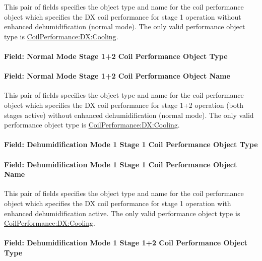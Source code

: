 This pair of fields specifies the object type and name for the coil performance object which specifies the DX coil performance for stage 1 operation without enhanced dehumidification (normal mode). The only valid performance object type is \hyperref[coilperformancedxcooling]{CoilPerformance:DX:Cooling}.

\paragraph{Field: Normal Mode Stage 1+2 Coil Performance Object Type}\label{field-normal-mode-stage-12-coil-performance-object-type}

\paragraph{Field: Normal Mode Stage 1+2 Coil Performance Object Name}\label{field-normal-mode-stage-12-coil-performance-object-name}

This pair of fields specifies the object type and name for the coil performance object which specifies the DX coil performance for stage 1+2 operation (both stages active) without enhanced dehumidification (normal mode). The only valid performance object type is \hyperref[coilperformancedxcooling]{CoilPerformance:DX:Cooling}.

\paragraph{Field: Dehumidification Mode 1 Stage 1 Coil Performance Object Type}\label{field-dehumidification-mode-1-stage-1-coil-performance-object-type}

\paragraph{Field: Dehumidification Mode 1 Stage 1 Coil Performance Object Name}\label{field-dehumidification-mode-1-stage-1-coil-performance-object-name}

This pair of fields specifies the object type and name for the coil performance object which specifies the DX coil performance for stage 1 operation with enhanced dehumidification active. The only valid performance object type is \hyperref[coilperformancedxcooling]{CoilPerformance:DX:Cooling}.

\paragraph{Field: Dehumidification Mode 1 Stage 1+2 Coil Performance Object Type}\label{field-dehumidification-mode-1-stage-12-coil-performance-object-type}

